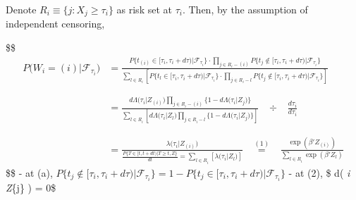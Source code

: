 \documentclass[
]{book}
\begin{document}
{{{Denote \(R_i \equiv \Big \{ j : X_j \ge \tau_i \Big \}\) as risk set at \(\tau_i\). Then, by the assumption of independent censoring,

\$\$
\begin{align}
P \Big ( W_i = (i) \Big | \mathcal F_{\tau_i} \Big)




&=
\frac{


P \Bigg \{ t_{(i)} \in \big[\tau_i , \tau_i + d\tau \big) \Bigg |\mathcal F_{\tau_i} \Bigg \} \cdot 
\prod\limits_{j \in R_i - (i)} P \Bigg \{ t_{j} \not \in \big[\tau_i , \tau_i + d\tau \big) \Bigg |\mathcal F_{\tau_i} \Bigg \} 
}{

\sum\limits_{l \in R_i} 
\left[
P \Bigg \{ t_{l} \in \big[\tau_i , \tau_i + d\tau \big) \Bigg |\mathcal F_{\tau_i} \Bigg \} \cdot 
\prod\limits_{j \in R_i - l} P \Bigg \{ t_{j} \not \in \big[\tau_i , \tau_i + d\tau \big) \Bigg |\mathcal F_{\tau_i} \Bigg \}
\right]
}
\tag{a}





\\
\\
\\


&=
\frac{
d\Lambda \Big( \tau_i \Big | Z_{(i)} \Big)
\prod\limits_{j \in R_i - (i)} \bigg \{ 1 - d\Lambda \Big( \tau_i \Big | Z_{j} \Big) \bigg \}
}{
\sum\limits_{l \in R_i} \left [ d\Lambda \Big( \tau_i \Big | Z_{l} \Big)
\prod\limits_{j \in R_i - l} \bigg \{ 1 - d\Lambda \Big( \tau_i \Big | Z_{j} \Big) \bigg \} \right ]
}


\; \; \; \div \; \; \; \frac{d\tau_i}{d\tau_i}

\tag{2}
\\
\\
\\

&= \frac{\lambda\Big(\tau_i \Big | Z_{(i)} \Big)}{ \frac{P \Big\{T\in [t, t+dt) \Big | T \ge t , Z \Big\}}{dt}= \sum\limits_{l\in R_i} \left[ \lambda\Big(\tau_i \Big | Z_{l} \Big) \right]}

\; \; \; \overset {(1)}{=}  \; \; \; 


\frac{\exp(\beta ' Z_{(i)})}{\sum\limits_{l\in R_i} \exp(\beta ' Z_{l})}





\end{align}
\$\$
- at (a), \(P \Bigg \{ t_{j} \not \in \big[\tau_i , \tau_i + d\tau \big) \Bigg |\mathcal F_{\tau_i} \Bigg \} = 1 - P \Bigg \{ t_{j} \in \big[\tau_i , \tau_i + d\tau \big) \Bigg |\mathcal F_{\tau_i} \Bigg \}\)
- at (2), \$ d\Lambda \Big( \tau\emph{i \Big \textbar{} Z}\{j\} \Big) = 0\$

}}}
\end{document}
